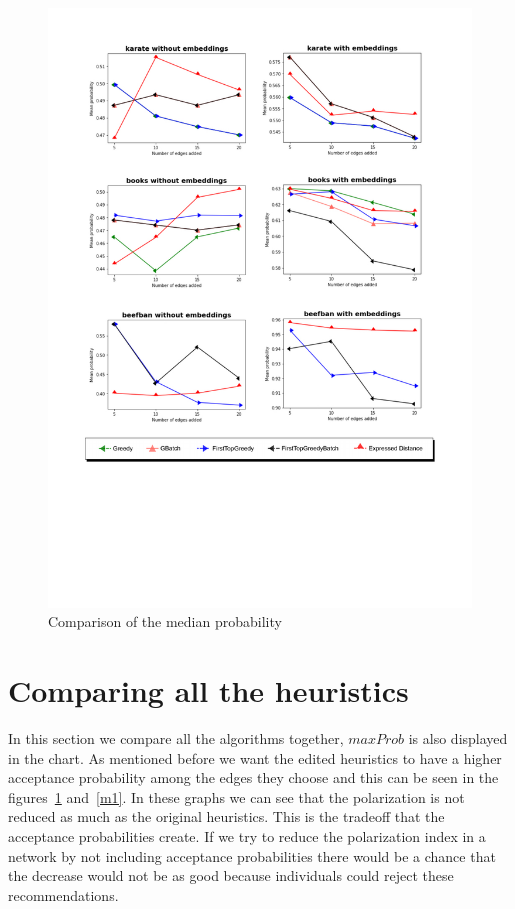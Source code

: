 \clearpage

\begin{figure}[!htbp]
	\begin{center}
	\advance\leftskip-1.3cm
	\captionsetup{justification=centering,margin=2cm}
	\includegraphics[width=1\textwidth]{Figures/m1}
	\caption{Comparison of the median probability}
	\label{m2}
	\end{center}
\end{figure}
\clearpage

\section{Comparing all the heuristics}		
\label{sec:all}

In this section we compare all the algorithms together, $maxProb$ is also displayed in the chart. As mentioned before we want the edited heuristics to have a higher acceptance probability among the edges they choose and this can be seen in the figures~\ref{m2} and~\ref{m1}. In these graphs we can see that the polarization is not reduced as much as the original heuristics. This is the tradeoff that the acceptance probabilities create. If we try to reduce the polarization index in a network by not including acceptance probabilities there would be a chance that the decrease would not be as good because individuals could reject these recommendations.
 
